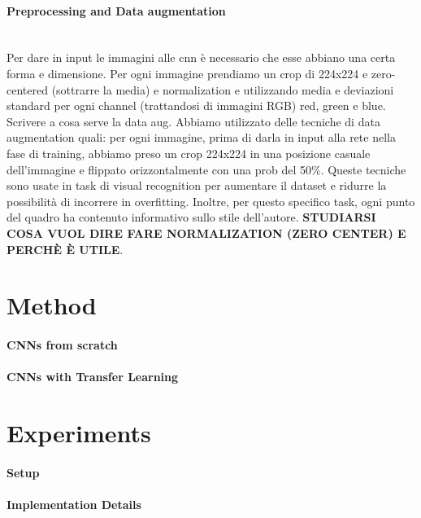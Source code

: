 \documentclass{article}
\begin{document}
\paragraph{Preprocessing and Data augmentation}\mbox{}\\
Per dare in input le immagini alle cnn è necessario che esse abbiano una certa forma e dimensione. Per ogni immagine prendiamo un crop di 224x224 e zero-centered (sottrarre la media) e normalization e utilizzando media e deviazioni standard per ogni channel (trattandosi di immagini RGB) red, green e blue. \\
Scrivere a cosa serve la data aug. Abbiamo utilizzato delle tecniche di data augmentation quali: per ogni immagine, prima di darla in input alla rete nella fase di training, abbiamo preso un crop 224x224 in una posizione casuale dell'immagine e flippato orizzontalmente con una prob del 50\%. Queste tecniche sono usate in task di visual recognition per aumentare il dataset e ridurre la possibilità di incorrere in overfitting.
Inoltre, per questo specifico task, ogni punto del quadro ha contenuto informativo sullo stile dell'autore.
\textbf{STUDIARSI COSA VUOL DIRE FARE NORMALIZATION (ZERO CENTER) E PERCHÈ È UTILE}.

\section{Method}\label{method}

\paragraph{CNNs from scratch}

\paragraph{CNNs with Transfer Learning}


\section{Experiments}\label{experiments}

\paragraph{Setup}

\paragraph{Implementation Details}
\end{document}
